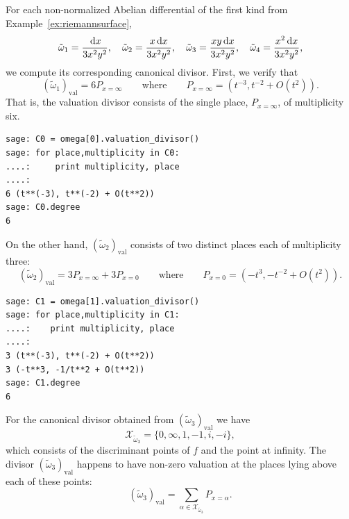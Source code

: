 \begin{example} \label{ex:canonical} %
For each non-normalized Abelian differential of the first kind from
Example~\ref{ex:riemannsurface},
\begin{equation}
  \tilde{\omega}_1 = \frac{\,\mathrm{d}x}{3x^2y^2}, \quad
  \tilde{\omega}_2 = \frac{x\,\mathrm{d}x}{3x^2y^2}, \quad
  \tilde{\omega}_3 = \frac{xy\,\mathrm{d}x}{3x^2y^2}, \quad
  \tilde{\omega}_4 = \frac{x^2\,\mathrm{d}x}{3x^2y^2},
\end{equation}
we compute its corresponding canonical divisor. First, we verify that
\begin{equation}
  (\tilde{\omega}_1)_\text{val} = 6 P_{x=\infty}
  \qquad
  \text{where}
  \qquad
  P_{x=\infty} = \left( t^{-3}, t^{-2} + O\left( t^2 \right) \right).
\end{equation}
That is, the valuation divisor consists of the single place, $P_{x=\infty}$, of
multiplicity six.
\begin{lstlisting}
sage: C0 = omega[0].valuation_divisor()
sage: for place,multiplicity in C0:
....:     print multiplicity, place
....:
6 (t**(-3), t**(-2) + O(t**2))
sage: C0.degree
6
\end{lstlisting}
On the other hand, $(\tilde{\omega}_2)_\text{val}$ consists of two distinct
places each of multiplicity three:
\begin{equation}
  (\tilde{\omega}_2)_\text{val} = 3 P_{x=\infty} + 3 P_{x=0}
  \qquad
  \text{where}
  \qquad
  P_{x=0} = \left( -t^3, -t^{-2} + O(t^2) \right).
\end{equation}
\begin{lstlisting}
sage: C1 = omega[1].valuation_divisor()
sage: for place,multiplicity in C1:
....:    print multiplicity, place
....:
3 (t**(-3), t**(-2) + O(t**2))
3 (-t**3, -1/t**2 + O(t**2))
sage: C1.degree
6
\end{lstlisting}
For the canonical divisor obtained from $(\tilde{\omega}_3)_\text{val}$ we have
\begin{equation}
  \mathcal{X}_{\tilde{\omega}_3} = \{0,\infty,1,-1,i,-i\},
\end{equation}
which consists of the discriminant points of $f$ and the point at infinity. The
divisor $(\tilde{\omega}_3)_\text{val}$ happens to have non-zero valuation at
the places lying above each of these points:
\begin{equation}
  (\tilde{\omega}_3)_\text{val}
  =
  \sum_{\alpha \in \mathcal{X}_{\tilde{\omega}_3}} P_{x=\alpha}.
\end{equation}
\begin{lstlisting}

\end{lstlisting}
\end{example}
